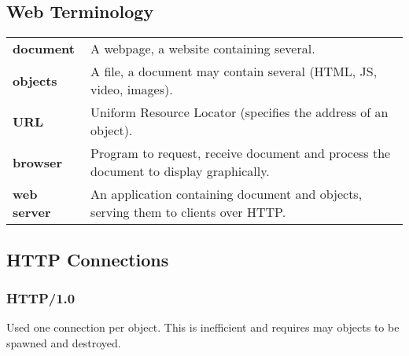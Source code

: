 \documentclass{report}
\begin{document}
        \subsection*{Web Terminology}
            \begin{center}
                \begin{tabular}{l p{}}
                    \textbf{document} & A webpage, a website containing several. \\
                    \textbf{objects} & A file, a document may contain several (HTML, JS, video, images). \\
                    \textbf{URL} & Uniform Resource Locator (specifies the address of an object). \\
                    \textbf{browser} & Program to request, receive document and process the document to display graphically. \\
                    \textbf{web server} & An application containing document and objects, serving them to clients over HTTP. \\
                \end{tabular}
            \end{center}
        \subsection*{HTTP Connections}
            \subsubsection*{HTTP/1.0}
                Used one  connection per object. This is inefficient and requires may objects to be spawned and destroyed.
\end{document}
